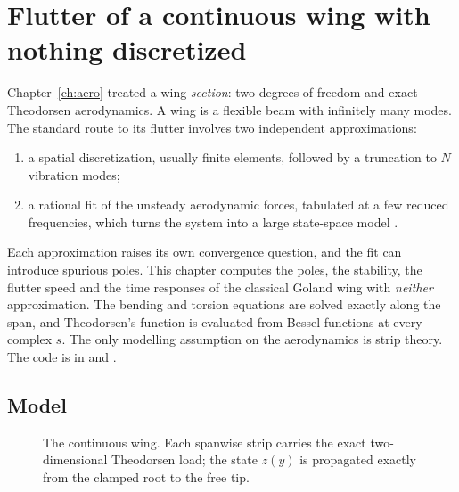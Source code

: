 \chapter{Flutter of a continuous wing with nothing discretized}\label{ch:wing}

Chapter~\ref{ch:aero} treated a wing \emph{section}: two degrees of freedom
and exact Theodorsen aerodynamics. A wing is a flexible beam with infinitely
many modes. The standard route to its flutter involves two independent
approximations:
\begin{enumerate}
  \item a spatial discretization, usually finite elements, followed by a
        truncation to $N$ vibration modes;
  \item a rational fit of the unsteady aerodynamic forces, tabulated at a
        few reduced frequencies, which turns the system into a large
        state-space model \citep{edwards1977,kaiser2022}.
\end{enumerate}
Each approximation raises its own convergence question, and the fit can
introduce spurious poles. This chapter computes the poles, the stability,
the flutter speed and the time responses of the classical Goland wing
\citep{goland1945} with \emph{neither} approximation. The bending and
torsion equations are solved exactly along the span, and Theodorsen's
function is evaluated from Bessel functions at every complex $s$. The only
modelling assumption on the aerodynamics is strip theory. The code is in
 and .

\section{Model}

\begin{figure}[H]
\centering

\caption{The continuous wing. Each spanwise strip carries the exact
two-dimensional Theodorsen load; the state $z(y)$ is propagated exactly
from the clamped root to the free tip.}
\label{fig:wing}
\end{figure}

